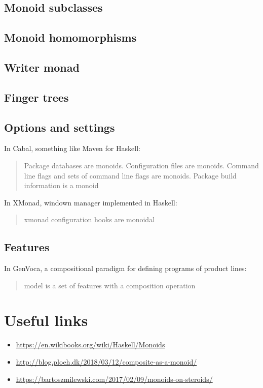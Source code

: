 \documentclass{article}
\begin{document}
    \subsection{Monoid subclasses}

    \subsection{Monoid homomorphisms}

    \subsection{Writer monad}

    \subsection{Finger trees}

    \subsection{Options and settings}

    In Cabal, something like Maven for Haskell: 

    \blockquote{Package databases are monoids. Configuration files are monoids. Command line flags and sets of command line flags are monoids. Package build information is a monoid}

    In XMonad, windown manager implemented in Haskell:

    \blockquote{xmonad configuration hooks are monoidal}

    \subsection{Features}

    In GenVoca, a compositional paradigm for defining programs of product lines:

    \blockquote{model is a set of features with a composition operation}

    \newpage

    \section{Useful links}

    \begin{itemize}
        \item \url{https://en.wikibooks.org/wiki/Haskell/Monoids}
        \item \url{http://blog.ploeh.dk/2018/03/12/composite-as-a-monoid/}
        \item \url{https://bartoszmilewski.com/2017/02/09/monoids-on-steroids/}
    \end{itemize}
\end{document}

